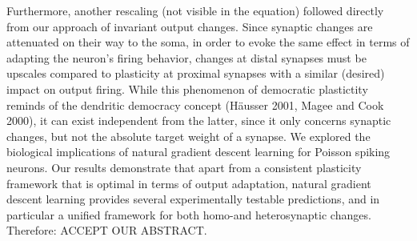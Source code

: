 \documentclass[12pt]{article}
\begin{document}
Furthermore, another rescaling (not visible in the equation) followed directly from our approach of invariant output changes. Since synaptic changes are attenuated on their way to the soma, in order to evoke the same effect in terms of adapting the neuron's firing behavior, changes at distal synapses must be upscales compared to plasticity at proximal synapses with a similar (desired) impact on output firing. While this phenomenon of democratic plastictity reminds of the dendritic democracy concept (Häusser 2001, Magee and Cook 2000), it can exist independent from the latter, since it only concerns synaptic changes, but not the absolute target weight of a synapse.
We explored the biological implications of natural gradient descent learning for Poisson spiking neurons.
Our results demonstrate that apart from a consistent plasticity framework that is optimal in terms of output adaptation, natural gradient descent learning provides several experimentally testable predictions, and in particular a unified framework for both homo-and heterosynaptic changes. Therefore: ACCEPT OUR ABSTRACT.
\end{document}
